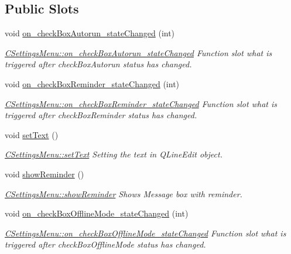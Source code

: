 \subsection*{Public Slots}
\begin{DoxyCompactItemize}
\item 
void \hyperlink{classCSettingsMenu_ade751a25d60360c8e9931623678f8868}{on\+\_\+check\+Box\+Autorun\+\_\+state\+Changed} (int)
\begin{DoxyCompactList}\small\item\em \hyperlink{classCSettingsMenu_ade751a25d60360c8e9931623678f8868}{C\+Settings\+Menu\+::on\+\_\+check\+Box\+Autorun\+\_\+state\+Changed} Function slot what is triggered after check\+Box\+Autorun status has changed. \end{DoxyCompactList}\item 
void \hyperlink{classCSettingsMenu_aeffe9813d7759a4250d464512b21f0d4}{on\+\_\+check\+Box\+Reminder\+\_\+state\+Changed} (int)
\begin{DoxyCompactList}\small\item\em \hyperlink{classCSettingsMenu_aeffe9813d7759a4250d464512b21f0d4}{C\+Settings\+Menu\+::on\+\_\+check\+Box\+Reminder\+\_\+state\+Changed} Function slot what is triggered after check\+Box\+Reminder status has changed. \end{DoxyCompactList}\item 
\mbox{\label{classCSettingsMenu_a5954a706372d9df4f773f9ebd361a924}} 
void \hyperlink{classCSettingsMenu_a5954a706372d9df4f773f9ebd361a924}{set\+Text} ()
\begin{DoxyCompactList}\small\item\em \hyperlink{classCSettingsMenu_a5954a706372d9df4f773f9ebd361a924}{C\+Settings\+Menu\+::set\+Text} Setting the text in Q\+Line\+Edit object. \end{DoxyCompactList}\item 
\mbox{\label{classCSettingsMenu_a73bcb0d0fcb70e259f736a6f9a28de87}} 
void \hyperlink{classCSettingsMenu_a73bcb0d0fcb70e259f736a6f9a28de87}{show\+Reminder} ()
\begin{DoxyCompactList}\small\item\em \hyperlink{classCSettingsMenu_a73bcb0d0fcb70e259f736a6f9a28de87}{C\+Settings\+Menu\+::show\+Reminder} Shows Message box with reminder. \end{DoxyCompactList}\item 
void \hyperlink{classCSettingsMenu_aeb0315c63ec3fdd1b214abb04624f12c}{on\+\_\+check\+Box\+Offline\+Mode\+\_\+state\+Changed} (int)
\begin{DoxyCompactList}\small\item\em \hyperlink{classCSettingsMenu_aeb0315c63ec3fdd1b214abb04624f12c}{C\+Settings\+Menu\+::on\+\_\+check\+Box\+Offline\+Mode\+\_\+state\+Changed} Function slot what is triggered after check\+Box\+Offline\+Mode status has changed. \end{DoxyCompactList}\end{DoxyCompactItemize}
